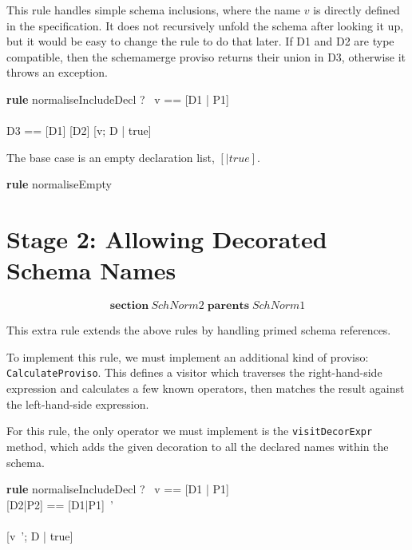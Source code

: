 \documentclass{article}
\newenvironment{zsection}{\[}{\]}
\newcommand{\SECTION}{\textbf{section}~}
\newcommand{\parents}{\mathrel{\textbf{parents}}}
\newenvironment{zedrule}[1]{\par\textbf{rule }#1\vspace{-1ex}\infrule}{\endinfrule}
\newcommand{\derives}{\derive{}}
\newcommand{\proviso}{\raisebox{0.5ex}{${}_{\blacktriangleright}\ $}}%
\newcommand{\schemamerge}{\mathbin{\textbf{schemamerge}}}
\begin{document}
This rule handles simple schema inclusions, where the name
$v$ is directly defined in the specification.  It does not
recursively unfold the schema after looking it up, but it would
be easy to change the rule to do that later.  If D1 and D2 are 
type compatible, then the schemamerge proviso returns their
union in D3, otherwise it throws an exception.

\begin{zedrule}{normaliseIncludeDecl}
   \proviso ?~ v == [D1 | P1] \\
   [D | true] \unfoldsTo [D2 | P2] \\
   \proviso D3 == [D1] \schemamerge [D2]
\derives
   [v; D | true] \unfoldsTo [D3 | P1 \land P2]
\end{zedrule}

The base case is an empty declaration list, $[|true]$.
\begin{zedrule}{normaliseEmpty}
   [~ | true] \unfoldsTo [~ | true]
\end{zedrule}


\section*{Stage 2: Allowing Decorated Schema Names}

\begin{zsection}
  \SECTION SchNorm2 \parents SchNorm1
\end{zsection}

This extra rule extends the above rules by handling primed schema
references.

To implement this rule, we must implement an additional kind of
proviso: \verb!CalculateProviso!.  This defines a visitor which
traverses the right-hand-side expression and calculates a few known
operators, then matches the result against the left-hand-side expression.

For this rule, the only operator we must implement is the
\verb!visitDecorExpr! method, which adds the given decoration to all the
declared names within the schema.

\begin{zedrule}{normaliseIncludeDecl}
   \proviso ?~ v == [D1 | P1] \\
   \proviso [D2|P2] == [D1|P1]~' \\
   [D | true] \unfoldsTo [D3 | P3] \\
\derives
   [v~'; D | true] \unfoldsTo [D2;D3 | P2 \land P3]
\end{zedrule}
\end{document}
